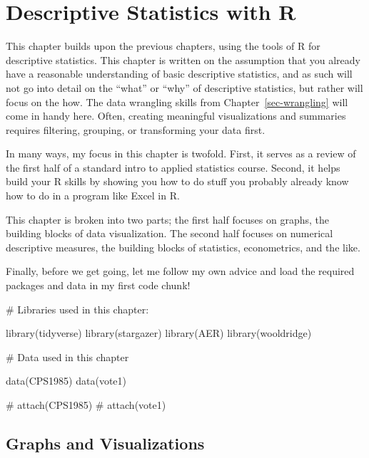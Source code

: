 \documentclass[
  letterpaper,
]{book}
\newenvironment{Shaded}{\begin{snugshade}}{\end{snugshade}}
\newcommand{\CommentTok}[1]{\textcolor[rgb]{0.37,0.37,0.37}{#1}}
\newcommand{\FunctionTok}[1]{\textcolor[rgb]{0.28,0.35,0.67}{#1}}
\newcommand{\NormalTok}[1]{\textcolor[rgb]{0.00,0.23,0.31}{#1}}
\begin{document}

\chapter{Descriptive Statistics with R}\label{sec-basicstats}

This chapter builds upon the previous chapters, using the tools of R for
descriptive statistics. This chapter is written on the assumption that
you already have a reasonable understanding of basic descriptive
statistics, and as such will not go into detail on the ``what'' or
``why'' of descriptive statistics, but rather will focus on the how. The
data wrangling skills from Chapter~\ref{sec-wrangling} will come in
handy here. Often, creating meaningful visualizations and summaries
requires filtering, grouping, or transforming your data first.

In many ways, my focus in this chapter is twofold. First, it serves as a
review of the first half of a standard intro to applied statistics
course. Second, it helps build your R skills by showing you how to do
stuff you probably already know how to do in a program like Excel in R.

This chapter is broken into two parts; the first half focuses on graphs,
the building blocks of data visualization. The second half focuses on
numerical descriptive measures, the building blocks of statistics,
econometrics, and the like.

Finally, before we get going, let me follow my own advice and load the
required packages and data in my first code chunk!

\begin{Shaded}
\begin{Highlighting}[]
\CommentTok{\# Libraries used in this chapter:}

\FunctionTok{library}\NormalTok{(tidyverse)}
\FunctionTok{library}\NormalTok{(stargazer)}
\FunctionTok{library}\NormalTok{(AER)}
\FunctionTok{library}\NormalTok{(wooldridge)}

\CommentTok{\# Data used in this chapter}

\FunctionTok{data}\NormalTok{(CPS1985)}
\FunctionTok{data}\NormalTok{(vote1)}

\CommentTok{\# attach(CPS1985)}
\CommentTok{\# attach(vote1)}
\end{Highlighting}
\end{Shaded}

\section{Graphs and Visualizations}\label{graphs-and-visualizations}
\end{document}
